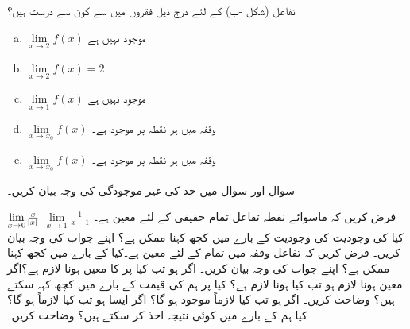 تفاعل  (شکل -ب)  کے لئے درج ذیل فقروں میں سے کون سے درست ہیں؟
\begin{multicols}{3}
\begin{enumerate}[a.]
\item
$\lim\limits_{x\to 2} f(x)$
موجود نہیں ہے
\item
$\lim\limits_{x\to 2}f(x)=2$
\item
$\lim\limits_{x\to 1}f(x)$
موجود نہیں ہے
\item
$\lim\limits_{x\to x_0}f(x)$
وقفہ  میں ہر نقطہ  پر موجود ہے۔
\item
$\lim\limits_{x\to x_0}f(x)$
وقفہ  میں ہر نقطہ  پر موجود ہے۔
\end{enumerate}
\end{multicols}


سوال  اور سوال  میں حد کی غیر موجودگی کی وجہ بیان کریں۔

$\lim\limits_{x \to 0}\tfrac{x}{\abs{x}}$
$\lim\limits_{x \to 1}\tfrac{1}{x-1}$
فرض کریں کہ ماسوائے نقطہ  تفاعل  تمام حقیقی  کے لئے معین ہے۔کیا  کی وجودیت کی وجودیت کے بارے میں کچھ کہنا ممکن ہے؟ اپنے جواب کی وجہ بیان کریں۔ 
فرض کریں کہ  تفاعل  وقفہ  میں تمام   کے لئے معین ہے۔کیا  کے بارے میں کچھ کہنا ممکن ہے؟ اپنے جواب کی وجہ بیان کریں۔ 
اگر  ہو تب کیا  پر  کا معین ہونا لازم ہے؟اگر معین ہونا لازم ہو تب کیا  ہونا لازم ہے؟ کیا  پر ہم  کی قیمت کے بارے میں کچھ کہہ سکتے ہیں؟ وضاحت کریں۔
اگر  ہو تب کیا  لازماً موجود ہو گا؟ اگر ایسا ہو تب کیا  لازماً ہو گا؟ کیا ہم   کے بارے میں کوئی نتیجہ اخذ کر سکتے ہیں؟ وضاحت کریں۔



